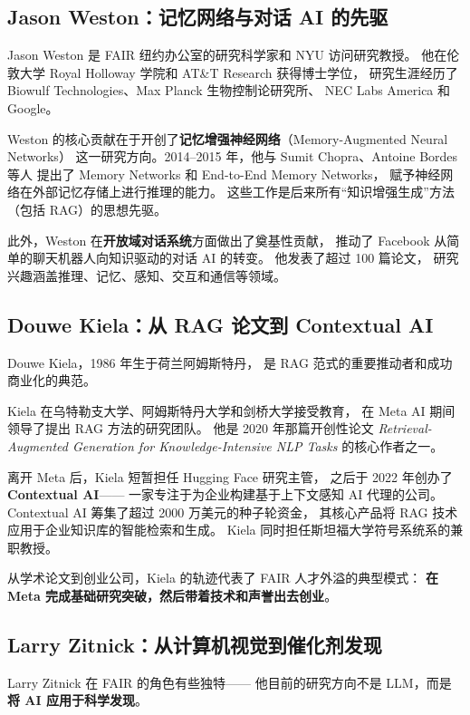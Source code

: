 \subsection{Jason Weston：记忆网络与对话 AI 的先驱}

Jason Weston 是 FAIR 纽约办公室的研究科学家和 NYU 访问研究教授。
他在伦敦大学 Royal Holloway 学院和 AT\&T Research 获得博士学位，
研究生涯经历了 Biowulf Technologies、Max Planck 生物控制论研究所、
NEC Labs America 和 Google。

Weston 的核心贡献在于开创了\textbf{记忆增强神经网络}（Memory-Augmented Neural Networks）
这一研究方向。2014--2015 年，他与 Sumit Chopra、Antoine Bordes 等人
提出了 Memory Networks 和 End-to-End Memory Networks，
赋予神经网络在外部记忆存储上进行推理的能力。
这些工作是后来所有``知识增强生成''方法（包括 RAG）的思想先驱。

此外，Weston 在\textbf{开放域对话系统}方面做出了奠基性贡献，
推动了 Facebook 从简单的聊天机器人向知识驱动的对话 AI 的转变。
他发表了超过 100 篇论文，
研究兴趣涵盖推理、记忆、感知、交互和通信等领域。

\subsection{Douwe Kiela：从 RAG 论文到 Contextual AI}

Douwe Kiela，1986 年生于荷兰阿姆斯特丹，
是 RAG 范式的重要推动者和成功商业化的典范。

Kiela 在乌特勒支大学、阿姆斯特丹大学和剑桥大学接受教育，
在 Meta AI 期间领导了提出 RAG 方法的研究团队。
他是 2020 年那篇开创性论文
\textit{Retrieval-Augmented Generation for Knowledge-Intensive NLP Tasks}
的核心作者之一。

离开 Meta 后，Kiela 短暂担任 Hugging Face 研究主管，
之后于 2022 年创办了 \textbf{Contextual AI}——
一家专注于为企业构建基于上下文感知 AI 代理的公司。
Contextual AI 筹集了超过 2000 万美元的种子轮资金，
其核心产品将 RAG 技术应用于企业知识库的智能检索和生成。
Kiela 同时担任斯坦福大学符号系统系的兼职教授。

从学术论文到创业公司，Kiela 的轨迹代表了 FAIR 人才外溢的典型模式：
\textbf{在 Meta 完成基础研究突破，然后带着技术和声誉出去创业}。

\subsection{Larry Zitnick：从计算机视觉到催化剂发现}

Larry Zitnick 在 FAIR 的角色有些独特——
他目前的研究方向不是 LLM，而是\textbf{将 AI 应用于科学发现}。

